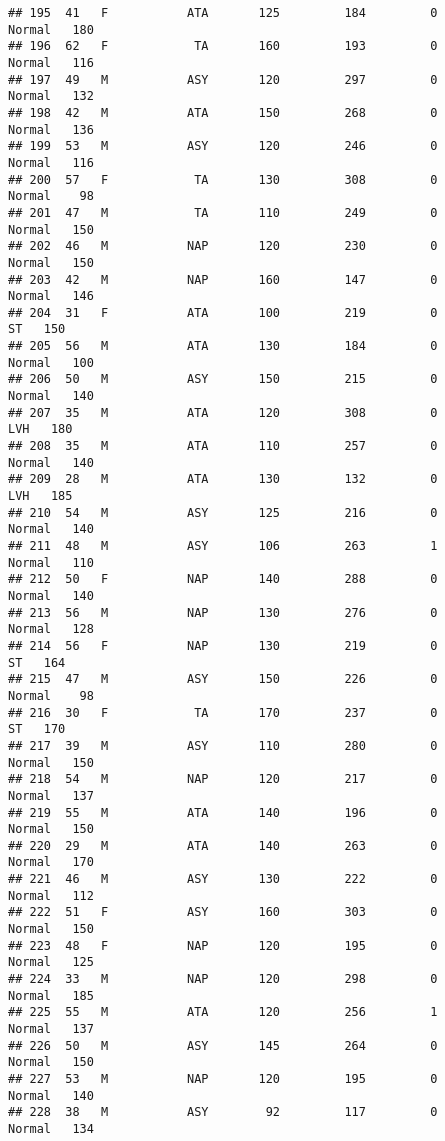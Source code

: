 \documentclass[
]{article}
\begin{document}
\begin{verbatim}
## 195  41   F           ATA       125         184         0     Normal   180
## 196  62   F            TA       160         193         0     Normal   116
## 197  49   M           ASY       120         297         0     Normal   132
## 198  42   M           ATA       150         268         0     Normal   136
## 199  53   M           ASY       120         246         0     Normal   116
## 200  57   F            TA       130         308         0     Normal    98
## 201  47   M            TA       110         249         0     Normal   150
## 202  46   M           NAP       120         230         0     Normal   150
## 203  42   M           NAP       160         147         0     Normal   146
## 204  31   F           ATA       100         219         0         ST   150
## 205  56   M           ATA       130         184         0     Normal   100
## 206  50   M           ASY       150         215         0     Normal   140
## 207  35   M           ATA       120         308         0        LVH   180
## 208  35   M           ATA       110         257         0     Normal   140
## 209  28   M           ATA       130         132         0        LVH   185
## 210  54   M           ASY       125         216         0     Normal   140
## 211  48   M           ASY       106         263         1     Normal   110
## 212  50   F           NAP       140         288         0     Normal   140
## 213  56   M           NAP       130         276         0     Normal   128
## 214  56   F           NAP       130         219         0         ST   164
## 215  47   M           ASY       150         226         0     Normal    98
## 216  30   F            TA       170         237         0         ST   170
## 217  39   M           ASY       110         280         0     Normal   150
## 218  54   M           NAP       120         217         0     Normal   137
## 219  55   M           ATA       140         196         0     Normal   150
## 220  29   M           ATA       140         263         0     Normal   170
## 221  46   M           ASY       130         222         0     Normal   112
## 222  51   F           ASY       160         303         0     Normal   150
## 223  48   F           NAP       120         195         0     Normal   125
## 224  33   M           NAP       120         298         0     Normal   185
## 225  55   M           ATA       120         256         1     Normal   137
## 226  50   M           ASY       145         264         0     Normal   150
## 227  53   M           NAP       120         195         0     Normal   140
## 228  38   M           ASY        92         117         0     Normal   134

\end{verbatim}
\end{document}
